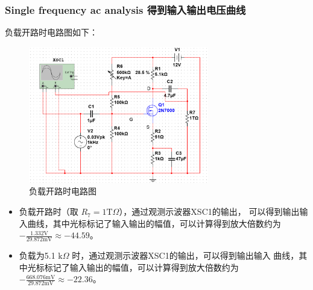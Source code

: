 \documentclass[a4paper,11pt,UTF8]{article}
\numberwithin{equation}{subsection}
\begin{document}
\subsubsection{Single frequency ac analysis 得到输入输出电压曲线}
负载开路时电路图如下：
\begin{figure}[H]
	\centering
	\includegraphics[width=0.7\textwidth]{2.4.png}	
	\caption{负载开路时电路图}
\end{figure}

\begin{itemize}
	\item 负载开路时（取 $R_7 = 1\text{T}\Omega$），通过观测示波器XSC1的输出，
	可以得到输出输入曲线，其中光标标记了输入输出的幅值，可以计算得到放大倍数约为
	$-\frac{1.332\text{V}}{29.872\text{mV}} \approx -44.59$。
	\item 负载为5.1 $\text{k}\Omega$ 时，通过观测示波器XSC1的输出，可以得到输出输入
	曲线，其中光标标记了输入输出的幅值，可以计算得到放大倍数约为
	$-\frac{668.076\text{mV}}{29.872\text{mV}} \approx -22.36$。
\end{itemize}

\begin{figure}[H]
\end{figure}
\end{document}
